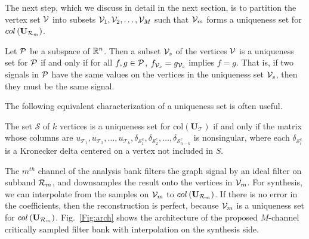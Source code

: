 \documentclass[journal, 10pt]{IEEEtran}
\begin{document}
The next step, which we discuss in detail in the next section, is to partition the vertex set ${\mathcal{V}}$ into subsets ${\mathcal{V}}_1,{\mathcal{V}}_2,\ldots,{\mathcal{V}}_M$ such that ${\mathcal{V}}_m$ forms a uniqueness set for $\mbox{col}\left(\mathbf{U}_{{\cal R}_m}\right)$.
\begin{definition}[Uniqueness set \cite{pesenson_paley}] 
Let ${\cal P}$ be a subspace of $\mathbb{R}^n$. 
Then a subset ${\mathcal{V}}_s$ of the vertices ${\mathcal{V}}$ is a uniqueness set for 
${\cal P}$ if  and only if for all %
$f,g \in {\cal P}$,
$f_{{\mathcal{V}}_s}=g_{{\mathcal{V}}_s}$ implies $f=g$. That is, if two signals in ${\cal P}$ have the same values on the vertices in the uniqueness set ${\mathcal{V}}_s$, then they must be the same signal.
\end{definition}
The following equivalent characterization of a uniqueness set is often useful.
\begin{lemma}\label{Le:eq_uniq}
The set $\mathcal{S}$ of $k$ vertices is a uniqueness set for $\mbox{col}({\mathbf{U}}_{\mathcal T})$ if and only if the matrix whose columns are $u_{{\mathcal T}_1},u_{{\mathcal T}_2},\ldots,u_{{\mathcal T}_k}, \delta_{{\mathcal{S}}^c_1}, \delta_{{\mathcal{S}}^c_2}, \ldots, \delta_{{\mathcal{S}}^c_{n-k}}$ is nonsingular,
where each $\delta_{{\mathcal{S}}^c_i}$ is a Kronecker delta centered on a vertex not included in $S$. 
\end{lemma}
The $m^{th}$ channel of the analysis %
bank %
filters the graph signal by an ideal %
filter on subband ${\cal R}_m$, and downsamples the result onto the vertices in ${\mathcal{V}}_m$. For synthesis, we can interpolate from the samples on ${\mathcal{V}}_m$ to $\mbox{col}\left(\mathbf{U}_{{\cal R}_m}\right)$. If there is no error in the coefficients, then the reconstruction is perfect, because ${\mathcal{V}}_m$ is a uniqueness set for $\mbox{col}\left(\mathbf{U}_{{\cal R}_m}\right)$. Fig.\ \ref{Fig:arch} shows the architecture of the proposed $M$-channel critically sampled filter bank with interpolation on the synthesis side.
\end{document}
